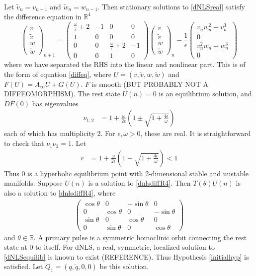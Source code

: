 \documentclass[12pt]{article}
\def\R{{\mathbb R}}
\begin{document}
Let $\tilde{v}_n = v_{n-1}$ and $\tilde{w}_n = w_{n-1}$. Then stationary solutions to \eqref{dNLSreal} satisfy the difference equation in $\R^4$
\begin{equation}\label{dnlsdiffR4}
\begin{pmatrix}
v \\ \tilde{v} \\ w \\ \tilde{w}
\end{pmatrix}_{n+1} =
\begin{pmatrix}
\frac{\omega}{\epsilon} + 2 & -1 & 0 & 0 \\
1 & 0 & 0 & 0 \\
0 & 0 & \frac{\omega}{\epsilon} + 2 & -1 \\
0 & 0 & 1 & 0
\end{pmatrix}
\begin{pmatrix}
v \\ \tilde{v} \\ w \\ \tilde{w}
\end{pmatrix}_n
- \frac{1}{\epsilon} 
\begin{pmatrix}
v_n w_n^2 + v_n^3 \\ 0 \\ v_n^2 w_n + w_n^3 \\ 0
\end{pmatrix}
\end{equation}
where we have separated the RHS into the linear and nonlinear part. This is of the form of equation \eqref{diffeq}, where $U = (v, \tilde{v}, w, \tilde{w})$ and $F(U) = A_\infty U + G(U)$. $F$ is smooth (BUT PROBABLY NOT A DIFFEOMORPHISM). The rest state $U(n) = 0$ is an equilibrium solution, and $DF(0)$ has eigenvalues
\begin{align*}
\nu_{1,2} &= 1 + \frac{\omega}{2 \epsilon} \left( 1 \pm \sqrt{1 + \frac{4 \epsilon}{\omega}} \right)
\end{align*}
each of which has multiplicity 2. For $\epsilon, \omega > 0$, these are real. It is straightforward to check that $\nu_1 \nu_2 = 1$. Let 
\begin{align*}
r &= 1 + \frac{\omega}{2 \epsilon} \left( 1 - \sqrt{1 + \frac{4 \epsilon}{\omega}} \right) < 1
\end{align*}
Thus 0 is a hyperbolic equilibrium point with 2-dimensional stable and unstable manifolds. Suppose $U(n)$ is a solution to \eqref{dnlsdiffR4}. Then $T(\theta)U(n)$ is also a solution to \eqref{dnlsdiffR4}, where
\begin{align}\label{TdNLS}
\begin{pmatrix}
\cos\theta & 0 &-\sin\theta & 0 \\
0 & \cos\theta & 0 &-\sin\theta \\
\sin\theta & 0 & \cos\theta & 0 \\
0 & \sin\theta & 0 & \cos\theta 
\end{pmatrix}
\end{align}
and $\theta \in \R$. A primary pulse is a symmetric homoclinic orbit connecting the rest state at 0 to itself. For dNLS, a real, symmetric, localized solution to \eqref{dNLSequilib} is known to exist (REFERENCE). Thus Hypothesis \ref{initialhyp} is satisfied. Let $Q_1 = (q, \tilde{q}, 0, 0)$ be this solution. 
\end{document}
